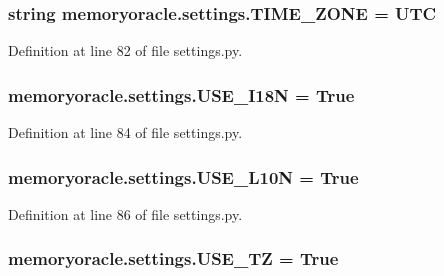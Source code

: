 \subsubsection[{T\+I\+M\+E\+\_\+\+Z\+O\+N\+E}]{\setlength{\rightskip}{0pt plus 5cm}string memoryoracle.\+settings.\+T\+I\+M\+E\+\_\+\+Z\+O\+N\+E = \textquotesingle{}U\+T\+C\textquotesingle{}}\label{namespacememoryoracle_1_1settings_a71b87e5d3e6de18ad0701a27d643558a}


Definition at line 82 of file settings.\+py.

\hypertarget{namespacememoryoracle_1_1settings_a8788c114be7d1e83fe9f03e1a9bc4f4d}{}
\subsubsection[{U\+S\+E\+\_\+\+I18\+N}]{\setlength{\rightskip}{0pt plus 5cm}memoryoracle.\+settings.\+U\+S\+E\+\_\+\+I18\+N = True}\label{namespacememoryoracle_1_1settings_a8788c114be7d1e83fe9f03e1a9bc4f4d}


Definition at line 84 of file settings.\+py.

\hypertarget{namespacememoryoracle_1_1settings_a59082cdfd1b4c6cde674a08c04015557}{}
\subsubsection[{U\+S\+E\+\_\+\+L10\+N}]{\setlength{\rightskip}{0pt plus 5cm}memoryoracle.\+settings.\+U\+S\+E\+\_\+\+L10\+N = True}\label{namespacememoryoracle_1_1settings_a59082cdfd1b4c6cde674a08c04015557}


Definition at line 86 of file settings.\+py.

\hypertarget{namespacememoryoracle_1_1settings_a4fa7a9ff610d0fe7965cd9f795d99aca}{}
\subsubsection[{U\+S\+E\+\_\+\+T\+Z}]{\setlength{\rightskip}{0pt plus 5cm}memoryoracle.\+settings.\+U\+S\+E\+\_\+\+T\+Z = True}\label{namespacememoryoracle_1_1settings_a4fa7a9ff610d0fe7965cd9f795d99aca}



